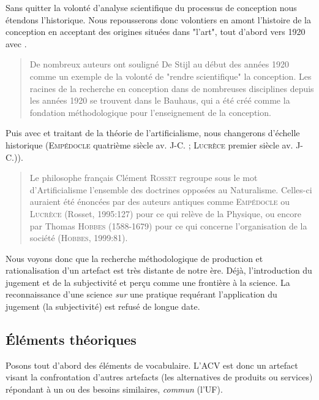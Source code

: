 Sans quitter la volonté d'analyse scientifique du processus de conception nous étendons l'historique.
Nous repousserons donc volontiers en amont l'histoire de la conception en acceptant des origines situées dans "l'art", tout d'abord vers 1920 avec \citeauthor{bayazit_investigating_2004}.
\blockcquote[traduction]{bayazit_investigating_2004}{
De nombreux auteurs ont souligné De Stijl au début des années 1920 comme un exemple de la volonté de "rendre scientifique" la conception.
Les racines de la recherche en conception dans de nombreuses disciplines depuis les années 1920 se trouvent dans le Bauhaus, qui a été créé comme la fondation méthodologique pour l'enseignement de la conception.}



Puis avec \citeauthor{micaelli_artificialisme:_2003} et traitant de la théorie de l'artificialisme, nous changerons d'échelle historique (\textsc{Empédocle} quatrième siècle av. J-C. ; \textsc{Lucrèce} premier siècle av. J-C.)).
\blockcquote[chapitre 3, p.48 3.3 Brève histoire de l'Artificialisme]{micaelli_artificialisme:_2003}{
Le philosophe français Clément \textsc{Rosset} regroupe sous le mot d'Artificialisme l'ensemble des doctrines opposées au Naturalisme.
Celles-ci auraient été énoncées par des auteurs antiques comme \textsc{Empédocle} ou \textsc{Lucrèce} (Rosset, 1995:127) pour ce qui relève de la Physique, ou encore par Thomas \textsc{Hobbes} (1588-1679) pour ce qui concerne l'organisation de la société (\textsc{Hobbes}, 1999:81).
}
Nous voyons donc que la recherche méthodologique de production et rationalisation d'un artefact est très distante de notre ère.
Déjà, l'introduction du jugement et de la subjectivité et perçu comme une frontière à la science.
La reconnaissance d'une science \textit{sur} une pratique requérant l'application du jugement (la subjectivité) est refusé de longue date.

\subsection{Éléments théoriques}
\label{subsection:Éléments théoriques}
Posons tout d'abord des éléments de vocabulaire.
L'\gls{ACV} est donc un artefact visant la confrontation d'autres artefacts (les alternatives de produits ou services) répondant à un ou des besoins similaires, \emph{commun} (l'\gls{UF}).


